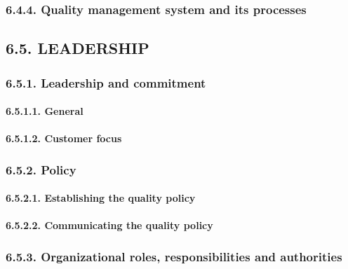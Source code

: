 \documentclass[
]{article}
\begin{document}
\hypertarget{quality-management-system-and-its-processes-1}{%
\subsubsection{6.4.4. Quality management system and its
processes}\label{quality-management-system-and-its-processes-1}}

\hypertarget{leadership-1}{%
\subsection{6.5. LEADERSHIP}\label{leadership-1}}

\hypertarget{leadership-and-commitment-1}{%
\subsubsection{6.5.1. Leadership and
commitment}\label{leadership-and-commitment-1}}

\hypertarget{general-9}{%
\paragraph{6.5.1.1. General}\label{general-9}}

\hypertarget{customer-focus-1}{%
\paragraph{6.5.1.2. Customer focus}\label{customer-focus-1}}

\hypertarget{policy-1}{%
\subsubsection{6.5.2. Policy}\label{policy-1}}

\hypertarget{establishing-the-quality-policy-1}{%
\paragraph{6.5.2.1. Establishing the quality
policy}\label{establishing-the-quality-policy-1}}

\hypertarget{communicating-the-quality-policy-1}{%
\paragraph{6.5.2.2. Communicating the quality
policy}\label{communicating-the-quality-policy-1}}

\hypertarget{organizational-roles-responsibilities-and-authorities-1}{%
\subsubsection{6.5.3. Organizational roles, responsibilities and
authorities}\label{organizational-roles-responsibilities-and-authorities-1}}
\end{document}
